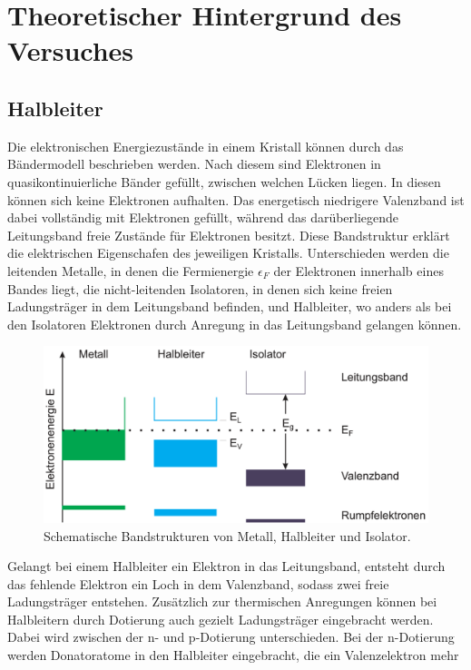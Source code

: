 \section{Theoretischer Hintergrund des Versuches}
\label{sec:Theorie}
\subsection{Halbleiter}
\label{sec:Halbleiter}
Die elektronischen Energiezustände in einem Kristall können durch das Bändermodell beschrieben werden. Nach diesem sind Elektronen in quasikontinuierliche
Bänder gefüllt, zwischen welchen Lücken liegen. In diesen können sich keine Elektronen aufhalten. Das energetisch niedrigere Valenzband ist dabei vollständig 
mit Elektronen gefüllt, während das darüberliegende Leitungsband freie Zustände für Elektronen besitzt. Diese Bandstruktur erklärt die elektrischen Eigenschafen
des jeweiligen Kristalls. Unterschieden werden die leitenden Metalle, in denen die Fermienergie $\epsilon_F$ der Elektronen innerhalb eines Bandes liegt,
die nicht-leitenden Isolatoren, in denen sich keine freien Ladungsträger in dem Leitungsband befinden, und Halbleiter, wo anders als bei den Isolatoren
Elektronen durch Anregung in das Leitungsband gelangen können. 
\begin{figure}[H]
    \centering
    \includegraphics[scale=0.4]{pictures/Bandstrukturen.png}
    \caption{Schematische Bandstrukturen von Metall, Halbleiter und Isolator. \cite{Halbleiter-Grundlagen}}
\end{figure}
\noindent
Gelangt bei einem Halbleiter ein Elektron in das Leitungsband, entsteht durch das fehlende Elektron ein Loch in dem Valenzband, sodass zwei freie 
Ladungsträger entstehen. Zusätzlich zur thermischen Anregungen können bei Halbleitern durch Dotierung auch gezielt Ladungsträger eingebracht werden.
Dabei wird zwischen der n- und p-Dotierung unterschieden. Bei der n-Dotierung werden Donatoratome in den Halbleiter eingebracht, die ein Valenzelektron mehr
